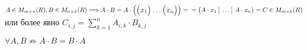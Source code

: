 \begin{definition}
    $A \in M_{m \times n}(R), B \in M_{n \times k}(R) \Longrightarrow A \cdot B = A \cdot 
    \large
    \begin{pmatrix}
        \begin{pmatrix}
            x_1
        \end{pmatrix}
        \dots
        \begin{pmatrix}
            x_n
        \end{pmatrix}
    \end{pmatrix} = \\\\
    \normalsize = 
    \begin{pmatrix}
        A \cdot x_1 \,\, \vrule \,\, \dots \,\, \vrule \,\, A \cdot x_n 
    \end{pmatrix} = C \in M_{m \times k}(R)
    $ или более явно $C_{i, j} = \sum\limits_{k = 1}^n A_{i,k} \cdot B_{k,j}$
\end{definition}

\quad
\begin{remark}
    $\forall A, B \not \Rightarrow A \cdot B = B \cdot A$\\
\end{remark}



